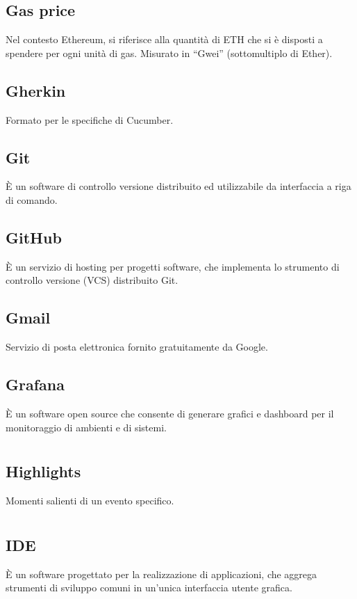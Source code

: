 	\subsection*{Gas price}
	Nel contesto Ethereum, si riferisce alla quantità di ETH che si è disposti a spendere per ogni unità di gas. Misurato in “Gwei” (sottomultiplo di Ether).
	\subsection*{Gherkin}
	Formato per le specifiche di Cucumber.
	\subsection*{Git}
	È un software di controllo versione distribuito ed utilizzabile da interfaccia a riga di comando.
	\subsection*{GitHub}
	È un servizio di hosting per progetti software, che implementa lo strumento di controllo versione (VCS) distribuito Git.
	\subsection*{Gmail}
	Servizio di posta elettronica fornito gratuitamente da Google.
	\subsection*{Grafana}
	È un software open source che consente di generare grafici e dashboard per il monitoraggio di ambienti e di sistemi.
\pagebreak
\section[H]{}
	\subsection*{Highlights}
	Momenti salienti di un evento specifico. 
\pagebreak
\section[I]{}
	\subsection*{IDE}
	È un software progettato per la realizzazione di applicazioni, che aggrega strumenti di sviluppo comuni in un’unica interfaccia utente grafica.
